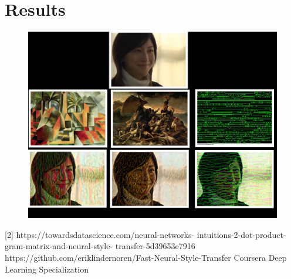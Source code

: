 \documentclass[oneside]{book}
\begin{document}
\section*{Results}
\begin{figure}[H]
\centerline{\includegraphics[scale=.5]{result.jpg}}
\end{figure}
\pagebreak



[2] https://towardsdatascience.com/neural-networks-             intuitions-2-dot-product-gram-matrix-and-neural-style-    transfer-5d39653e7916 
\bigbreak
\noindent[3] https://github.com/eriklindernoren/Fast-Neural-Style-Transfer
\bigbreak
\noindent[4] Coursera Deep Learning Specialization
\end{document}
